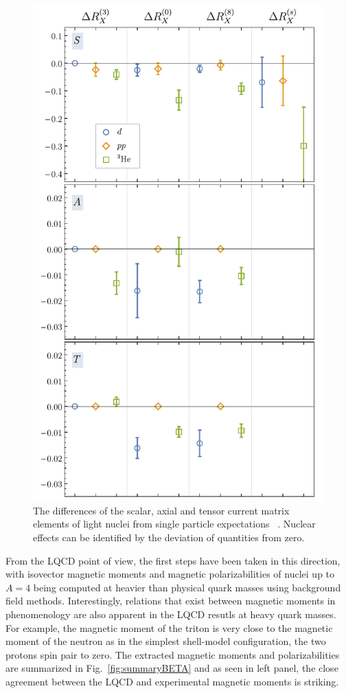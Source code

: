 %
\begin{figure}
	\vspace*{-0cm}
	\centering
	\includegraphics[width=0.4\columnwidth]{figures/RatioSummary.pdf}  
	\caption{ 
		The differences of the scalar, axial and tensor current matrix elements of light nuclei from single particle expectations ~\protect\cite{Beane:2015yha}. Nuclear effects can be identified by the deviation of quantities from zero.   
	}
	\label{fig:SAT}
	\vspace*{-0.5cm}
\end{figure}
%
From the LQCD point of view,  the first steps have been taken in this direction, with isovector magnetic moments \cite{Beane:2014ora,Beane:2015yha,Detmold:2015daa} and magnetic  polarizabilities \cite{Chang:2015qxa} of nuclei up to $A=4$ being computed at heavier than physical quark masses using background field methods. Interestingly, relations that exist between magnetic moments in phenomenology are also apparent in the LQCD resutls at heavy quark masses. For example,  the magnetic moment of the triton is very close to the magnetic moment of the neutron as in the simplest shell-model configuration, the two protons spin pair to zero. The extracted magnetic moments and polarizabilities are summarized in Fig.~\ref{fig:summaryBETA} and as seen in left panel, the close agreement between the LQCD  and experimental magnetic moments is striking.

